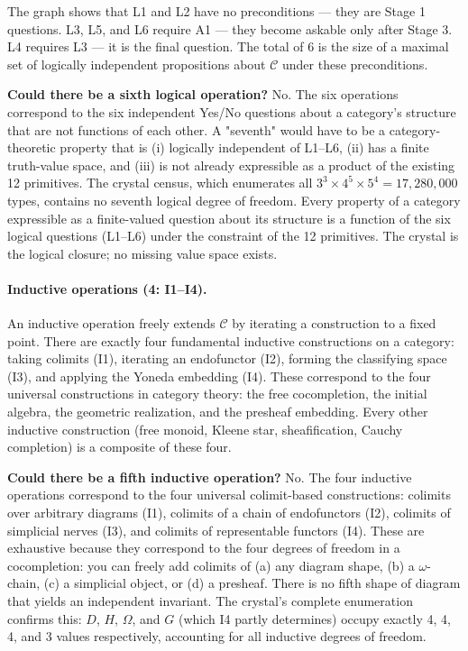 \documentclass[12pt,a4paper]{article}
\begin{document}
The graph shows that L1 and L2 have no preconditions --- they are Stage 1 questions. L3, L5, and L6 require A1 --- they become askable only after Stage 3. L4 requires L3 --- it is the final question. The total of 6 is the size of a maximal set of logically independent propositions about $\mathcal{C}$ under these preconditions.

\textbf{Could there be a sixth logical operation?} No. The six operations correspond to the six independent Yes/No questions about a category's structure that are not functions of each other. A "seventh" would have to be a category-theoretic property that is (i) logically independent of L1--L6, (ii) has a finite truth-value space, and (iii) is not already expressible as a product of the existing 12 primitives. The crystal census, which enumerates all $3^3 \times 4^5 \times 5^4 = 17{,}280{,}000$ types, contains no seventh logical degree of freedom. Every property of a category expressible as a finite-valued question about its structure is a function of the six logical questions (L1--L6) under the constraint of the 12 primitives. The crystal is the logical closure; no missing value space exists.

\paragraph{Inductive operations (4: I1--I4).}
An inductive operation freely extends $\mathcal{C}$ by iterating a construction to a fixed point. There are exactly four fundamental inductive constructions on a category: taking colimits (I1), iterating an endofunctor (I2), forming the classifying space (I3), and applying the Yoneda embedding (I4). These correspond to the four universal constructions in category theory: the free cocompletion, the initial algebra, the geometric realization, and the presheaf embedding. Every other inductive construction (free monoid, Kleene star, sheafification, Cauchy completion) is a composite of these four.

\textbf{Could there be a fifth inductive operation?} No. The four inductive operations correspond to the four universal colimit-based constructions: colimits over arbitrary diagrams (I1), colimits of a chain of endofunctors (I2), colimits of simplicial nerves (I3), and colimits of representable functors (I4). These are exhaustive because they correspond to the four degrees of freedom in a cocompletion: you can freely add colimits of (a) any diagram shape, (b) a $\omega$-chain, (c) a simplicial object, or (d) a presheaf. There is no fifth shape of diagram that yields an independent invariant. The crystal's complete enumeration confirms this: $D$, $H$, $\Omega$, and $G$ (which I4 partly determines) occupy exactly 4, 4, 4, and 3 values respectively, accounting for all inductive degrees of freedom.
\end{document}
